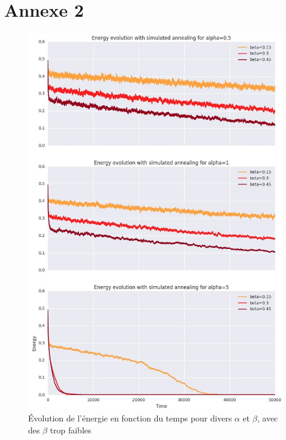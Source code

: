 \documentclass[twocolumn]{article}
\begin{document}
\section{Annexe 2}
\begin{figure}[!h]
	\includegraphics[width=\columnwidth]{../tobekept/skype_1.jpg}
	\caption{Évolution de l'énergie en fonction du temps pour divers $\alpha$ et $\beta$, avec des $\beta$ trop faibles}
\end{figure}
\end{document}
